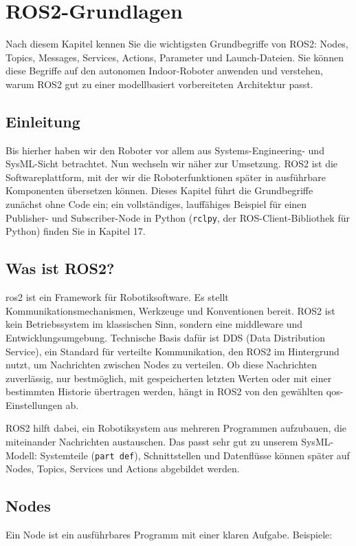 \chapter{ROS2-Grundlagen}

\begin{lernziele}
Nach diesem Kapitel kennen Sie die wichtigsten Grundbegriffe von ROS2: Nodes, Topics, Messages, Services, Actions, Parameter und Launch-Dateien. Sie können diese Begriffe auf den autonomen Indoor-Roboter anwenden und verstehen, warum ROS2 gut zu einer modellbasiert vorbereiteten Architektur passt.
\end{lernziele}

\section{Einleitung}
Bis hierher haben wir den Roboter vor allem aus Systems-Engineering- und SysML-Sicht betrachtet. Nun wechseln wir näher zur Umsetzung. ROS2 ist die Softwareplattform, mit der wir die Roboterfunktionen später in ausführbare Komponenten übersetzen können. Dieses Kapitel führt die Grundbegriffe zunächst ohne Code ein; ein vollständiges, lauffähiges Beispiel für einen Publisher- und Subscriber-Node in Python (\texttt{rclpy}, der ROS-Client-Bibliothek für Python) finden Sie in Kapitel 17.

\section{Was ist ROS2?}
\gls{ros2} ist ein Framework für Robotiksoftware. Es stellt Kommunikationsmechanismen, Werkzeuge und Konventionen bereit. ROS2 ist kein Betriebssystem im klassischen Sinn, sondern eine \gls{middleware} und Entwicklungsumgebung. Technische Basis dafür ist DDS (Data Distribution Service), ein Standard für verteilte Kommunikation, den ROS2 im Hintergrund nutzt, um Nachrichten zwischen Nodes zu verteilen. Ob diese Nachrichten zuverlässig, nur bestmöglich, mit gespeicherten letzten Werten oder mit einer bestimmten Historie übertragen werden, hängt in ROS2 von den gewählten \gls{qos}-Einstellungen ab.

ROS2 hilft dabei, ein Robotiksystem aus mehreren Programmen aufzubauen, die miteinander Nachrichten austauschen. Das passt sehr gut zu unserem SysML-Modell: Systemteile (\texttt{part def}), Schnittstellen und Datenflüsse können später auf Nodes, Topics, Services und Actions abgebildet werden.

\section{Nodes}
Ein Node ist ein ausführbares Programm mit einer klaren Aufgabe. Beispiele:

